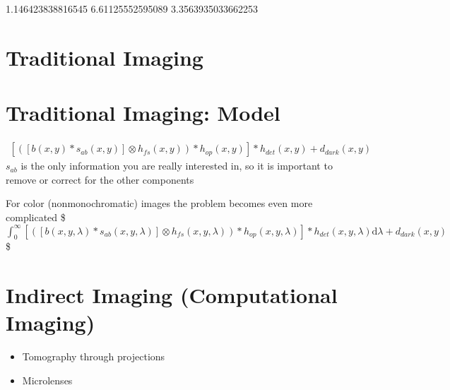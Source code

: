 \documentclass[letterpaper,10pt,english]{sphinxmanual}
\begin{document}
\begin{sphinxVerbatim}[commandchars=\\\{\}]
1.146423838816545 6.61125552595089 3.3563935033662253
\end{sphinxVerbatim}

\noindent{}


\section{Traditional Imaging}
\label{\detokenize{01-Introduction:traditional-imaging}}





\section{Traditional Imaging: Model}
\label{\detokenize{01-Introduction:traditional-imaging-model}}
\sphinxAtStartPar
{}
\begin{equation*}
\begin{split}
\left[\left([b(x,y)*s_{ab}(x,y)]\otimes h_{fs}(x,y)\right)*h_{op}(x,y)\right]*h_{det}(x,y)+d_{dark}(x,y)
\end{split}
\end{equation*}
\sphinxAtStartPar
\(s_{ab}\) is the only information you are really interested in, so it is important to remove or correct for the other components

\sphinxAtStartPar
For color (non\sphinxhyphen{}monochromatic) images the problem becomes even more complicated
\$\(
\int_{0}^{\infty} {\left[\left([b(x,y,\lambda)*s_{ab}(x,y,\lambda)]\otimes h_{fs}(x,y,\lambda)\right)*h_{op}(x,y,\lambda)\right]*h_{det}(x,y,\lambda)}\mathrm{d}\lambda+d_{dark}(x,y)
\)\$


\section{Indirect Imaging (Computational Imaging)}
\label{\detokenize{01-Introduction:indirect-imaging-computational-imaging}}

\begin{itemize}
\item {} 
\sphinxAtStartPar
Tomography through projections

\item {} 
\sphinxAtStartPar
Microlenses 

\end{itemize}
\end{document}
